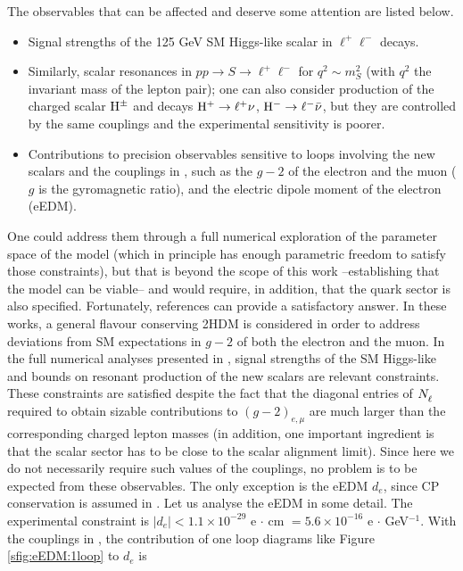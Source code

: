 \documentclass[12pt,a4paper]{article}
\begin{document}
The observables that can be affected and deserve some attention are listed below.
\begin{itemize}
 \item Signal strengths of the 125 GeV SM Higgs-like scalar in $\ell^+\ell^-$ decays.
 \item Similarly, scalar resonances in $pp\to S\to\ell^+\ell^-$ for $q^2\sim m_{S}^2$ (with $q^2$ the invariant mass of the lepton pair); one can also consider production of the charged scalar ${\rm H}^\pm$ and decays ${\rm H}^+\to\ell^+\nu$, ${\rm H}^-\to\ell^-\bar\nu$, but they are controlled by the same couplings and the experimental sensitivity is poorer.
 \item Contributions to precision observables sensitive to loops involving the new scalars and the couplings in , such as the $g-2$ of the electron and the muon ($g$ is the gyromagnetic ratio), and the electric dipole moment of the electron (eEDM).
\end{itemize}
One could address them through a full numerical exploration of the parameter space of the model (which in principle has enough parametric freedom to satisfy those constraints), but that is beyond the scope of this work --establishing that the model can be viable-- and would require, in addition, that the quark sector is also specified. Fortunately, references \cite{Botella:2020xzf,Botella:2022rte,Botella:2023tiw} can provide a satisfactory answer. In these works, a general flavour conserving 2HDM is considered in order to address deviations from SM expectations in $g-2$ of both the electron and the muon. In the full numerical analyses presented in \cite{Botella:2020xzf,Botella:2022rte,Botella:2023tiw}, signal strengths of the SM Higgs-like and bounds on resonant production of the new scalars are relevant constraints. These constraints are satisfied despite the fact that the diagonal entries of $\mNL$ required to obtain sizable contributions to $(g-2)_{e,\mu}$ are much larger than the corresponding charged lepton masses (in addition, one important ingredient is that the scalar sector has to be close to the scalar alignment limit). Since here we do not necessarily require such values of the couplings, no problem is to be expected from these observables. The only exception is the eEDM $d_e$, since CP conservation is assumed in \cite{Botella:2020xzf,Botella:2022rte,Botella:2023tiw}. Let us analyse the eEDM in some detail. The experimental constraint is $|d_e|<1.1\times 10^{-29}$ e $\cdot$ cm $=5.6\times 10^{-16}$ e $\cdot$ GeV$^{-1}$. With the couplings in , the contribution of one loop diagrams like Figure \ref{sfig:eEDM:1loop} to $d_e$ is
\end{document}
